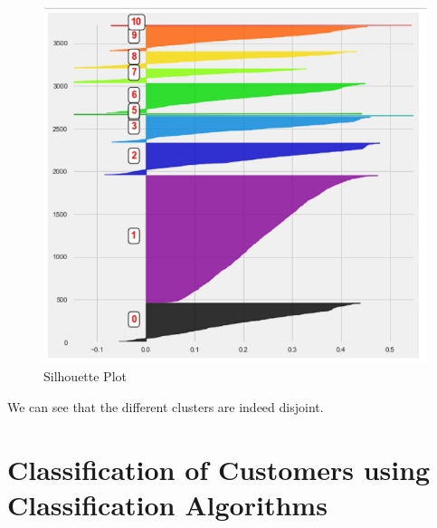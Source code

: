 \begin{figure}
\caption{Silhouette Plot}
\label{4.5}
\centering
\includegraphics[width=\columnwidth]{images/4_5.PNG}
\end{figure}

We can see that the different clusters are indeed disjoint.

\section{Classification of Customers using Classification Algorithms}


